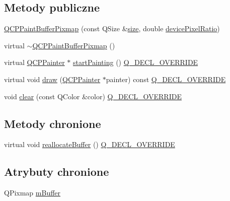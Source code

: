 \subsection*{Metody publiczne}
\begin{DoxyCompactItemize}
\item 
\hyperlink{class_q_c_p_paint_buffer_pixmap_aef0224e03b9285509391fcd61a8e6844}{Q\+C\+P\+Paint\+Buffer\+Pixmap} (const Q\+Size \&\hyperlink{class_q_c_p_abstract_paint_buffer_aad79fd72221e4614a771c03985798d9b}{size}, double \hyperlink{class_q_c_p_abstract_paint_buffer_a107d55bb234b5d19651157071d3b2c37}{device\+Pixel\+Ratio})
\item 
virtual \hyperlink{class_q_c_p_paint_buffer_pixmap_a52b00bff4a36085b197bd374d5d24450}{$\sim$\+Q\+C\+P\+Paint\+Buffer\+Pixmap} ()
\item 
virtual \hyperlink{class_q_c_p_painter}{Q\+C\+P\+Painter} $\ast$ \hyperlink{class_q_c_p_paint_buffer_pixmap_a357964ef7d28cfa530338be4e5c93234}{start\+Painting} () \hyperlink{qcustomplot_8hh_a42cc5eaeb25b85f8b52d2a4b94c56f55}{Q\+\_\+\+D\+E\+C\+L\+\_\+\+O\+V\+E\+R\+R\+I\+DE}
\item 
virtual void \hyperlink{class_q_c_p_paint_buffer_pixmap_af7bfc685e56a0a9329e57cd9a265eb74}{draw} (\hyperlink{class_q_c_p_painter}{Q\+C\+P\+Painter} $\ast$painter) const \hyperlink{qcustomplot_8hh_a42cc5eaeb25b85f8b52d2a4b94c56f55}{Q\+\_\+\+D\+E\+C\+L\+\_\+\+O\+V\+E\+R\+R\+I\+DE}
\item 
void \hyperlink{class_q_c_p_paint_buffer_pixmap_a14badbd010a3cde6b55817ccb7b65217}{clear} (const Q\+Color \&color) \hyperlink{qcustomplot_8hh_a42cc5eaeb25b85f8b52d2a4b94c56f55}{Q\+\_\+\+D\+E\+C\+L\+\_\+\+O\+V\+E\+R\+R\+I\+DE}
\end{DoxyCompactItemize}
\subsection*{Metody chronione}
\begin{DoxyCompactItemize}
\item 
virtual void \hyperlink{class_q_c_p_paint_buffer_pixmap_ad49f3205ba3463b1c44f8db3cfcc90f0}{reallocate\+Buffer} () \hyperlink{qcustomplot_8hh_a42cc5eaeb25b85f8b52d2a4b94c56f55}{Q\+\_\+\+D\+E\+C\+L\+\_\+\+O\+V\+E\+R\+R\+I\+DE}
\end{DoxyCompactItemize}
\subsection*{Atrybuty chronione}
\begin{DoxyCompactItemize}
\item 
Q\+Pixmap \hyperlink{class_q_c_p_paint_buffer_pixmap_a6d7009f45f03e305f2dc00e52a9225f8}{m\+Buffer}
\end{DoxyCompactItemize}


